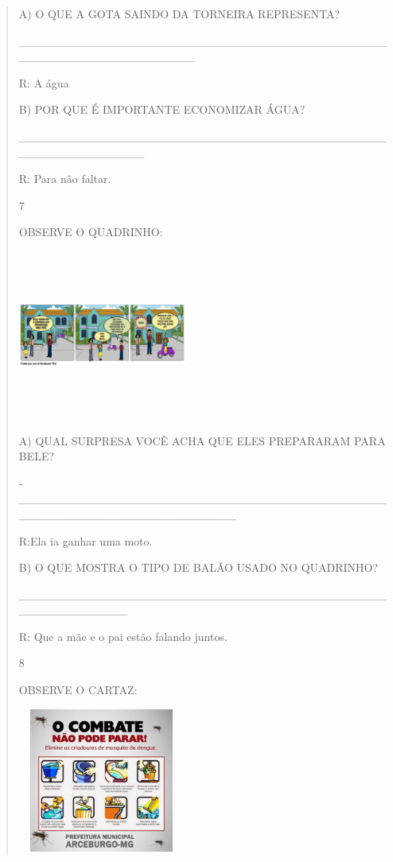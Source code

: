 {{{{\begin{verse}
{{\begin{escolha}
{{{{{A) O QUE A GOTA SAINDO DA TORNEIRA REPRESENTA?

\_\_\_\_\_\_\_\_\_\_\_\_\_\_\_\_\_\_\_\_\_\_\_\_\_\_\_\_\_\_\_\_\_\_\_\_\_\_\_\_\_\_\_\_\_\_\_\_\_\_\_\_\_\_\_\_\_\_\_\_\_\_\_\_\_

R: A água

B) POR QUE É IMPORTANTE ECONOMIZAR ÁGUA?

\_\_\_\_\_\_\_\_\_\_\_\_\_\_\_\_\_\_\_\_\_\_\_\_\_\_\_\_\_\_\_\_\_\_\_\_\_\_\_\_\_\_\_\_\_\_\_\_\_\_\_\_\_\_\_\_\_\_\_

R: Para não faltar.

\num{7}

OBSERVE O QUADRINHO:

\includegraphics[width=2.17917in,height=2.18750in]{media/image129.png}

A) QUAL SURPRESA VOCÊ ACHA QUE ELES PREPARARAM PARA BELE?

­­­­­­­­­­­­­­­­­­­­­­­\_\_\_\_\_\_\_\_\_\_\_\_\_\_\_\_\_\_\_\_\_\_\_\_\_\_\_\_\_\_\_\_\_\_\_\_\_\_\_\_\_\_\_\_\_\_\_\_\_\_\_\_\_\_\_\_\_\_\_\_\_\_\_\_\_\_\_\_\_\_

R:Ela ia ganhar uma moto.

B) O QUE MOSTRA O TIPO DE BALÃO USADO NO QUADRINHO?

\_\_\_\_\_\_\_\_\_\_\_\_\_\_\_\_\_\_\_\_\_\_\_\_\_\_\_\_\_\_\_\_\_\_\_\_\_\_\_\_\_\_\_\_\_\_\_\_\_\_\_\_\_\_\_\_\_

R: Que a mãe e o pai estão falando juntos.

\num{8}

OBSERVE O CARTAZ:

\includegraphics[width=2.15306in,height=1.86730in]{media/image134.jpeg}

}}}}}
\end{escolha}}}
\end{verse}}}}}
